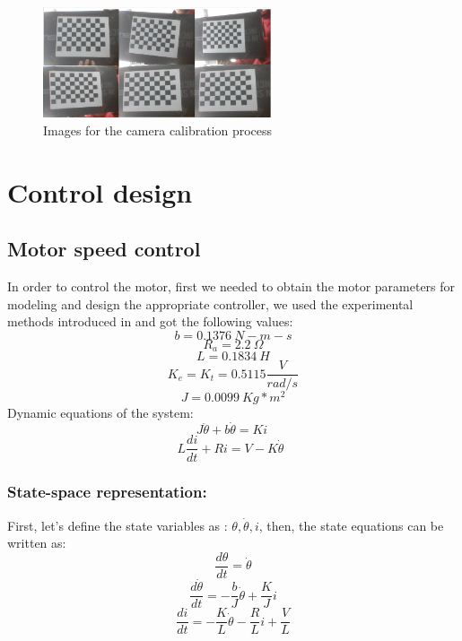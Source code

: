 \begin{figure}[h!]
    \centering
 	\includegraphics[trim=0 0 0 0,clip,width=0.6\textwidth]{Figs/Calib.png}
    \caption{Images for the camera calibration process}
    \label{fig:Chessboard}
\end{figure}



\section{Control design}
\subsection{Motor speed control}
In order to control the motor, first we needed to obtain the motor parameters for modeling and design the appropriate controller, we used the experimental methods introduced in {} and got the following values:
\[b=0.1376\ N-m-s\]
\[R_a=2.2\ \Omega\]
\[L=0.1834\ H\]
\[K_e=K_t=0.5115\frac{V}{rad/s}\]
\[J=0.0099\ Kg\ast m^2\]
Dynamic equations of the system:
\[J\ddot{\theta}+b\dot{\theta}=Ki\ \]
\[L\frac{di}{dt}+Ri=V-K\dot{\theta}\ \ \] 
\subsubsection{State-space representation:}
First, let's define the state variables as : $\theta, \dot{\theta},i$, then, the state equations can be written as:
\[\frac{d\theta}{dt}=\dot{\theta}\]
\[\frac{d\dot{\theta}}{dt}=-\frac{b}{J}\dot{\theta}+\frac{K}{J}i\]
\[\frac{di}{dt}=-\frac{K}{L}\dot{\theta}-\frac{R}{L}i+\frac{V}{L}\]

